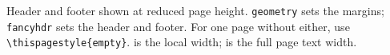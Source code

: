\begin{referencecode}
\usepackage[margin=25mm,headheight=24pt]{geometry}
\usepackage{fancyhdr}
\pagestyle{fancy}
\fancyhf{}
\fancyfoot[C]{\thepage}
\setlength{\parindent}{0pt}
\setlength{\parskip}{6pt}
\end{referencecode}

\begin{center}\end{center}
Header and footer shown at reduced page height.
\texttt{geometry} sets the margins; \texttt{fancyhdr} sets the header and
footer. For one page without either, use \verb|\thispagestyle{empty}|.
\texttt{\string\linewidth} is the local width; \texttt{\string\textwidth}
is the full page text width.
